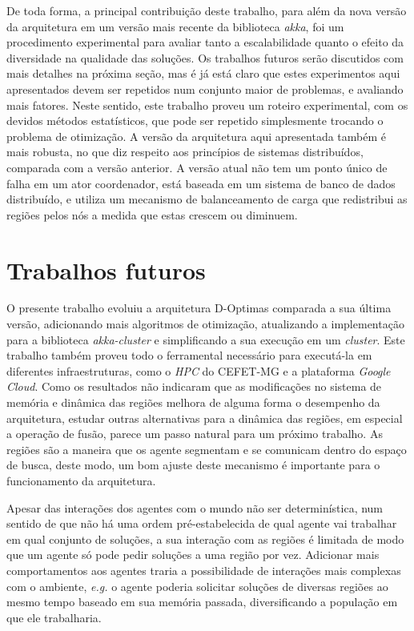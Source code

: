 De toda forma, a principal contribuição deste trabalho, para além da nova versão da arquitetura em um versão mais recente da biblioteca \textit{akka}, foi um procedimento experimental para avaliar tanto a escalabilidade quanto o efeito da diversidade na qualidade das soluções. Os trabalhos futuros serão discutidos com mais detalhes na próxima seção, mas é já está claro que estes experimentos aqui apresentados devem ser repetidos num conjunto maior de problemas, e avaliando mais fatores. Neste sentido, este trabalho proveu um roteiro experimental, com os devidos métodos estatísticos, que pode ser repetido simplesmente trocando o problema de otimização. A versão da arquitetura aqui apresentada também é mais robusta, no que diz respeito aos princípios de sistemas distribuídos, comparada com a versão anterior. A versão atual não tem um ponto único de falha em um ator coordenador, está baseada em um sistema de banco de dados distribuído, e utiliza um mecanismo de balanceamento de carga que redistribui as regiões pelos nós a medida que estas crescem ou diminuem. 

\section{Trabalhos futuros}

O presente trabalho evoluiu a arquitetura D-Optimas comparada a sua última versão, adicionando mais algoritmos de otimização, atualizando a implementação para a biblioteca \textit{akka-cluster} e simplificando a sua execução em um \textit{cluster}. Este trabalho também proveu todo o ferramental necessário para executá-la em diferentes infraestruturas, como o \textit{HPC} do CEFET-MG e a plataforma \textit{Google Cloud}. Como os resultados não indicaram que as modificações no sistema de memória e dinâmica das regiões melhora de alguma forma o desempenho da arquitetura, estudar outras alternativas para a dinâmica das regiões, em especial a operação de fusão, parece um passo natural para um próximo trabalho. As regiões são a maneira que os agente segmentam e se comunicam dentro do espaço de busca, deste modo, um bom ajuste deste mecanismo é importante para o funcionamento da arquitetura.

Apesar das interações dos agentes com o mundo não ser determinística, num sentido de que não há uma ordem pré-estabelecida de qual agente vai trabalhar em qual conjunto de soluções, a sua interação com as regiões é limitada de modo que um agente só pode pedir soluções a uma região por vez. Adicionar mais comportamentos aos agentes traria a possibilidade de interações mais complexas com o ambiente, \textit{e.g.} o agente poderia solicitar soluções de diversas regiões ao mesmo tempo baseado em sua memória passada, diversificando a população em que ele trabalharia.


